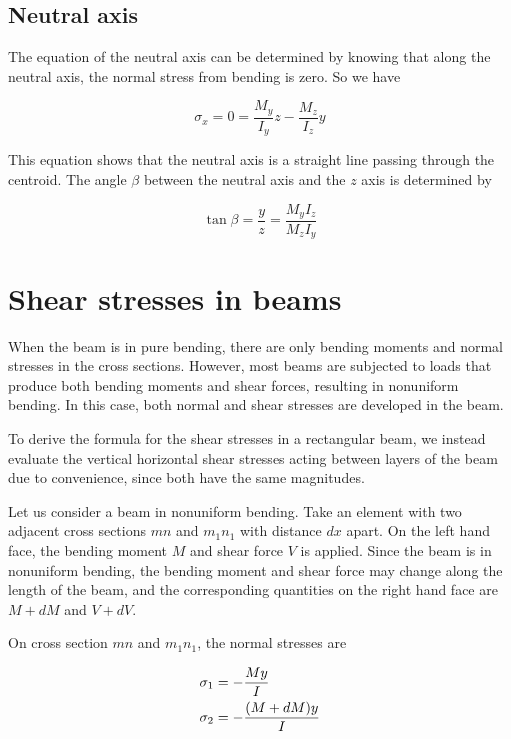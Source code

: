 \documentclass[
fontsize=10pt,
a4paper,
twosides=false,
open=any,
svgnames,
]{kaobook} %
\begin{document}
\subsection{Neutral axis}

The equation of the neutral axis can be determined by knowing that along the neutral axis, the normal stress from bending is zero. So we have

\begin{equation}
  \sigma_x = 0 = \frac{M_y}{I_y}z - \frac{M_z}{I_z}y
\end{equation}

This equation shows that the neutral axis is a straight line passing through the centroid. The angle $\beta$ between the neutral axis and the $z$ axis is determined by

\begin{equation}
  \tan \beta  = \frac{y}{z} = \frac{M_yI_z}{M_zI_y}
\end{equation}

\section{Shear stresses in beams}

When the beam is in pure bending, there are only bending moments and normal stresses in the cross sections. However, most beams are subjected to loads that produce both bending moments and shear forces, resulting in nonuniform bending. In this case, both normal and shear stresses are developed in the beam.

To derive the formula for the shear stresses in a rectangular beam, we instead evaluate the vertical horizontal shear stresses acting between layers of the beam due to convenience, since both have the same magnitudes.

Let us consider a beam in nonuniform bending. Take an element with two adjacent cross sections $mn$ and $m_1n_1$ with distance $dx$ apart. On the left hand face, the bending moment $M$ and shear force $V$ is applied. Since the beam is in nonuniform bending, the bending moment and shear force may change along the length of the beam, and the corresponding quantities on the right hand face are $M + dM$ and $V + dV$.

On cross section $mn$ and $m_1n_1$, the normal stresses are

\[\begin{gathered}
  \sigma _1 =  - \frac{My}{I} \hfill \\
  \sigma _2 =  - \frac{(M + dM)y}{I} \hfill \\ 
\end{gathered} \]
\end{document}

